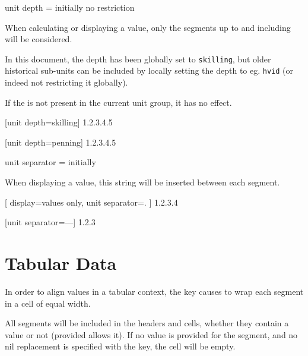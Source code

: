 \documentclass[
	a4paper,
	margin=4cm
]{article}
\begin{document}
\begin{docKey}
	{unit depth}
	{=}
	{initially no restriction}
	
	When calculating or displaying a value, only the segments up to and including  will be considered.
	
	In this document, the depth has been globally set to \texttt{skilling}, but older historical sub-units can be included by locally setting the depth to eg. \texttt{hvid} (or indeed not restricting it globally).
	
	If the  is not present in the current unit group, it has no effect.
	
\begin{dispExample}
	[unit depth=skilling]
	{1.2.3.4.5}

	[unit depth=penning]
	{1.2.3.4.5}
\end{dispExample}
\end{docKey}

\begin{docKey}
	{unit separator}
	{=}
	{initially }
	
	When displaying a value, this string will be inserted between each segment.

\begin{dispExample}
[
		display=values only,
		unit separator=.
	]
	{1.2.3.4}

	[unit separator={---}]
	{1.2.3}
\end{dispExample}

\end{docKey}


\clearpage
\section{Tabular Data} %

In order to align values in a tabular context, the  key causes  to wrap each segment in a cell of equal width.

All segments will be included in the headers and cells, whether they contain a value or not (provided  allows it). If no value is provided for the segment, and no nil replacement is specified with the  key, the cell will be empty.
\end{document}
